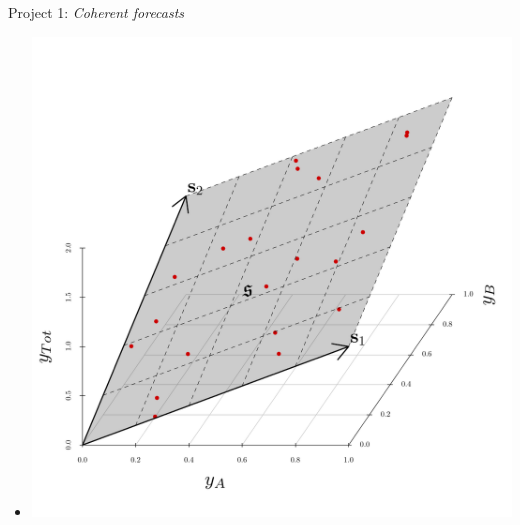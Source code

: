 \documentclass[11pt,xcolor=dvipsnames,handout]{beamer} %
\begin{document}
\begin{frame}{Project 1: \textit{Coherent forecasts}}
\begin{itemize}[<+-| alert@+>]
	\item[] 		
	\centering
	\vspace{-1.5cm}
	\includegraphics[scale=0.45]{Figs/3D_hierarchy}
	
\end{itemize}    
\end{frame}


\end{document}
